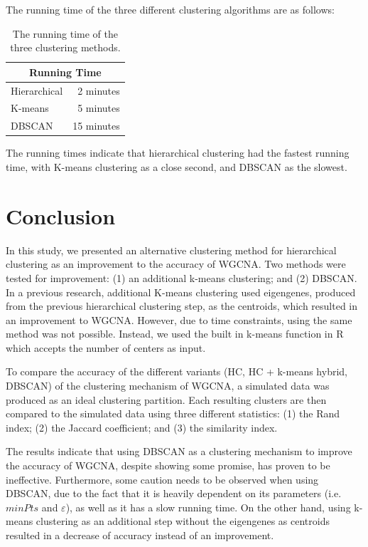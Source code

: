 \documentclass[sigconf,authordraft]{acmart}
\begin{document}
The running time of the three different clustering algorithms are as follows:

\begin{table}[H]
\begin{center}
\begin{tabular}{|l|r|}
\hline
\multicolumn{2}{|c|}{Running Time} \tabularnewline
\hline
Hierarchical & 2 minutes \\
\hline
K-means & 5 minutes \\
\hline
DBSCAN & 15 minutes \\
\hline
\end{tabular}
\end{center}
\caption{The running time of the three clustering methods.}
\end{table}

The running times indicate that hierarchical clustering had the fastest running time, with K-means clustering as a close second, and DBSCAN as the slowest.

\section{Conclusion}
In this study, we presented an alternative clustering method for hierarchical clustering as an improvement to the accuracy of WGCNA. Two methods were tested for improvement: (1) an additional k-means clustering; and (2) DBSCAN. In a previous research, additional K-means clustering used eigengenes, produced from the previous hierarchical clustering step, as the centroids, which resulted in an improvement to WGCNA. However, due to time constraints, using the same method was not possible. Instead, we used the built in k-means function in R \cite{RLanguageEnvironment} which accepts the number of centers as input. 

To compare the accuracy of the different variants (HC, HC + k-means hybrid, DBSCAN) of the clustering mechanism of WGCNA, a simulated data was produced as an ideal clustering partition. Each resulting clusters are then compared to the simulated data using three different statistics: (1) the Rand index; (2) the Jaccard coefficient; and (3) the similarity index. 

The results indicate that using DBSCAN as a clustering mechanism to improve the accuracy of WGCNA, despite showing some promise, has proven to be ineffective. Furthermore, some caution needs to be observed when using DBSCAN, due to the fact that it is heavily dependent on its parameters (i.e. $minPts$ and $\varepsilon$), as well as it has a slow running time. On the other hand, using k-means clustering as an additional step without the eigengenes as centroids resulted in a decrease of accuracy instead of an improvement.
\end{document}
